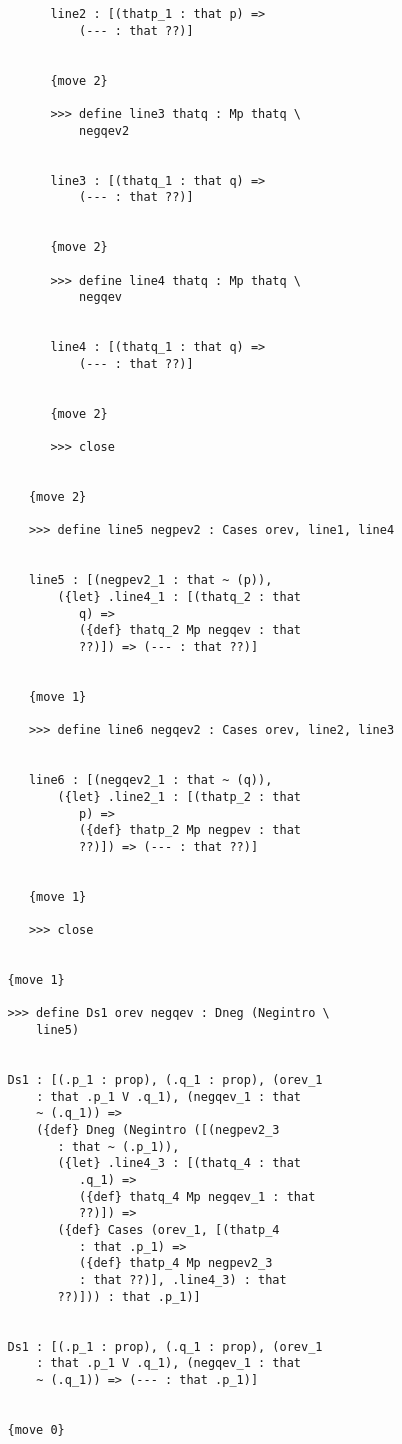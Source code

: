 \documentclass[12pt]{article}
\begin{document}
\begin{verbatim}
         line2 : [(thatp_1 : that p) => 
             (--- : that ??)]


         {move 2}

         >>> define line3 thatq : Mp thatq \
             negqev2


         line3 : [(thatq_1 : that q) => 
             (--- : that ??)]


         {move 2}

         >>> define line4 thatq : Mp thatq \
             negqev


         line4 : [(thatq_1 : that q) => 
             (--- : that ??)]


         {move 2}

         >>> close


      {move 2}

      >>> define line5 negpev2 : Cases orev, line1, line4


      line5 : [(negpev2_1 : that ~ (p)), 
          ({let} .line4_1 : [(thatq_2 : that 
             q) => 
             ({def} thatq_2 Mp negqev : that 
             ??)]) => (--- : that ??)]


      {move 1}

      >>> define line6 negqev2 : Cases orev, line2, line3


      line6 : [(negqev2_1 : that ~ (q)), 
          ({let} .line2_1 : [(thatp_2 : that 
             p) => 
             ({def} thatp_2 Mp negpev : that 
             ??)]) => (--- : that ??)]


      {move 1}

      >>> close


   {move 1}

   >>> define Ds1 orev negqev : Dneg (Negintro \
       line5)


   Ds1 : [(.p_1 : prop), (.q_1 : prop), (orev_1 
       : that .p_1 V .q_1), (negqev_1 : that 
       ~ (.q_1)) => 
       ({def} Dneg (Negintro ([(negpev2_3 
          : that ~ (.p_1)), 
          ({let} .line4_3 : [(thatq_4 : that 
             .q_1) => 
             ({def} thatq_4 Mp negqev_1 : that 
             ??)]) => 
          ({def} Cases (orev_1, [(thatp_4 
             : that .p_1) => 
             ({def} thatp_4 Mp negpev2_3 
             : that ??)], .line4_3) : that 
          ??)])) : that .p_1)]


   Ds1 : [(.p_1 : prop), (.q_1 : prop), (orev_1 
       : that .p_1 V .q_1), (negqev_1 : that 
       ~ (.q_1)) => (--- : that .p_1)]


   {move 0}


\end{verbatim}
\end{document}
